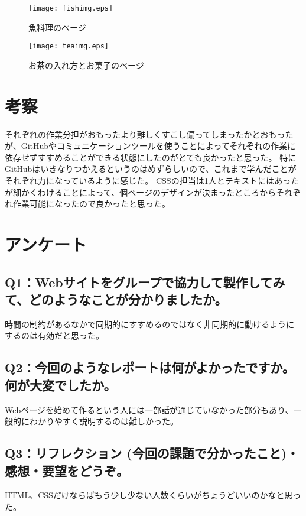 \documentclass[12pt,a4j]{jarticle}
\begin{document}
\begin{figure}[htbp]
\begin{center}
\texttt{[image: fishimg.eps]}
\caption{魚料理のページ}\label{fishimg}
\end{center}
\end{figure}

\begin{figure}[htbp]
\begin{center}
\texttt{[image: teaimg.eps]}
\caption{お茶の入れ方とお菓子のページ}\label{teaimg}
\end{center}
\end{figure}

\section{考察}
それぞれの作業分担がおもったより難しくすこし偏ってしまったかとおもったが、GitHubやコミュニケーションツールを使うことによってそれぞれの作業に依存せずすすめることができる状態にしたのがとても良かったと思った。
特にGitHubはいきなりつかえるというのはめずらしいので、これまで学んだことがそれぞれ力になっているように感じた。
CSSの担当は1人とテキストにはあったが細かくわけることによって、個ページのデザインが決まったところからそれぞれ作業可能になったので良かったと思った。
\section{アンケート}

\subsection{Q1：Webサイトをグループで協力して製作してみて、どのようなことが分かりましたか。}
時間の制約があるなかで同期的にすすめるのではなく非同期的に動けるようにするのは有効だと思った。

\subsection{Q2：今回のようなレポートは何がよかったですか。何が大変でしたか。}
Webページを始めて作るという人には一部話が通じていなかった部分もあり、一般的にわかりやすく説明するのは難しかった。
\subsection{Q3：リフレクション (今回の課題で分かったこと)・感想・要望をどうぞ。}
HTML、CSSだけならばもう少し少ない人数くらいがちょうどいいのかなと思った。
\end{document}

